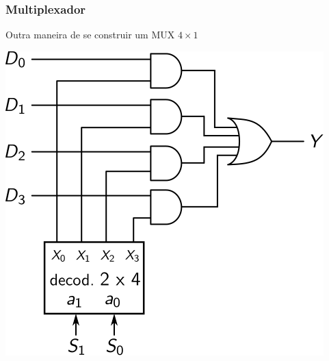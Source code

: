 \documentclass{beamer}
\begin{document}
\begin{frame}
%

\end{frame}

\begin{frame}
\frametitle{Multiplexador}

Outra maneira de se construir um MUX $4\times1$

\begin{center}
\includegraphics{images/mux4x1_decod}
\end{center}
\end{frame}
\end{document}

